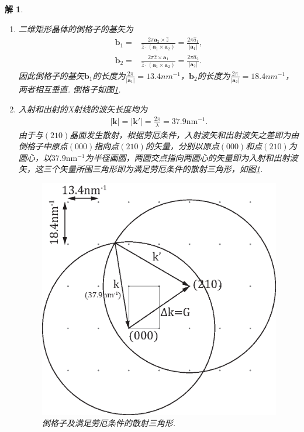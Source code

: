 \documentclass[UTF8,10pt,a4paper]{article}
\theoremstyle{Problem}
\theoremstyle{Solution}
\newtheorem*{sol}{解}
\providecommand{\abs}[1]{\left\lvert#1\right\rvert}
\begin{document}
\begin{sol}
    \begin{enumerate}
        \item[(a)] 二维矩形晶体的倒格子的基矢为
        \begin{align}
            \bm{b}_1=&\frac{2\pi\bm{a}_2\times\hat{z}}{\hat{z}\cdot(\bm{a}_1\times\bm{a}_2)}=\frac{2\pi\hat{a}_1}{\abs{\bm{a}_1}},\\
            \bm{b}_2=&\frac{2\pi\hat{z}\times\bm{a}_1}{\hat{z}\cdot(\bm{a}_1\times\bm{a}_2)}=\frac{2\pi\hat{a}_2}{\abs{\bm{a}_2}}.
        \end{align}
        因此倒格子的基矢$\bm{b}_1$的长度为$\frac{2\pi}{\abs{\bm{a}_1}}=13.4nm^{-1}$，$\bm{b}_2$的长度为$\frac{2\pi}{\abs{\bm{a}_2}}=18.4nm^{-1}$，两者相互垂直. 倒格子如图\ref{1-RL}.
        \item[(b)] 入射和出射的X射线的波矢长度均为
        \begin{align}
            \abs{\bm{k}}=\abs{\bm{k}'}=\frac{2\pi}{\lambda}=37.9\text{nm}^{-1}.
        \end{align}
        由于与$(210)$晶面发生散射，根据劳厄条件，入射波矢和出射波矢之差即为由倒格子中原点$(000)$指向点$(210)$的矢量，分别以原点$(000)$和点$(210)$为圆心，以$37.9\text{nm}^{-1}$为半径画圆，两圆交点指向两圆心的矢量即为入射和出射波矢，这三个矢量所围三角形即为满足劳厄条件的散射三角形，如图\ref{1-RL}.
        \begin{figure}[h]
            \centering
            \includegraphics[width=.4\textwidth]{1.eps}
            \caption{倒格子及满足劳厄条件的散射三角形.}
            \label{1-RL}
        \end{figure}
    \end{enumerate}
\end{sol}
\end{document}
